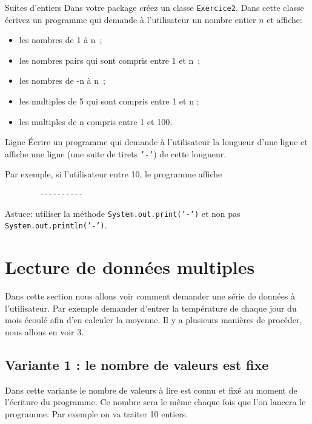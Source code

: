\documentclass[a4paper,11pt]{article}
\begin{document}
 
	\begin{Exercice}{Suites d'entiers}	
		Dans votre package créez un classe \texttt{Exercice2}.
		Dans cette classe écrivez un programme qui demande à l'utilisateur un nombre entier $n$ et affiche:
		\begin{itemize}
			\item  les nombres de 1 à n~;
			\item  les nombres pairs qui sont compris entre 1 et n~;
			\item les nombres de -n à n~;
			\item les multiples de 5 qui sont compris entre 1 et n ;
			\item les multiples de n compris entre 1 et 100.
		\end{itemize}
	\end{Exercice}

	\begin{Exercice}{Ligne}	
		\'Ecrire un programme qui demande à l'utilisateur 
		la longueur d'une ligne et affiche une ligne (une suite de tirets \texttt{'-'}) de cette longueur.
		
		Par exemple, si l'utilisateur entre 10, le programme affiche
		
		\begin{verbatim}
		----------
		\end{verbatim}
		
		Astuce: utiliser la méthode \texttt{System.out.print('-')} et non pas \texttt{System.out.println('-')}.
	\end{Exercice}
 
 \section{Lecture de données multiples}
 
 	Dans cette section nous allons voir comment demander une série de données à l'utilisateur.
	Par exemple demander d'entrer la température de chaque jour du mois écoulé afin d'en calculer la moyenne.
	Il y a plusieurs manières de procéder, nous allons en voir 3.

	\subsection{Variante 1 : le nombre de valeurs est fixe}

		Dans cette variante le nombre de valeurs à lire est connu et fixé au moment de l'écriture du 
		programme. Ce nombre sera le même chaque fois que l'on
		lancera le programme.
		Par exemple on va traiter 10 entiers. 	
			
\end{document}
